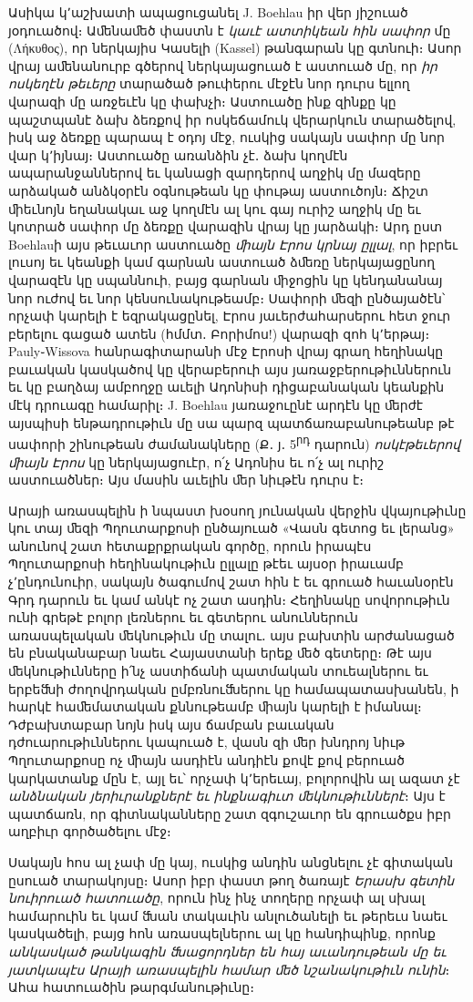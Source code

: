 \documentclass{article}
\begin{document}
{Ասիկա կ՚աշխատի ապացուցանել J. Boehlau իր վեր յիշուած յօդուածով։ Աﬔնաﬔծ փաստն է \emph{կաւէ ատտիկեան հին սափոր} մը (Λήκυθος), որ ներկայիս Կասելի (Kassel) թանգարան կը գտնուի։ Ասոր վրայ աﬔնանուրբ գծերով ներկայացուած է աստուած մը, որ \emph{իր ոսկեղէն թեւերը} տարածած թուփերու մէջէն նոր դուրս ելլող վարազի մը առջեւէն կը փախչի։ Աստուածը ինք զինքը կը պաշտպանէ ձախ ձեռքով իր ոսկեճամուկ վերարկուն տարածելով, իսկ աջ ձեռքը պարապ է օդոյ մէջ, ուսկից սակայն սափոր մը նոր վար կ՚իյնայ։ Աստուածը առանձին չէ․ ձախ կողմէն ապարանջաններով եւ կանացի զարդերով աղջիկ մը մազերը արձակած անձկօրէն օգնութեան կը փութայ աստուծոյն։ Ճիշտ ﬕեւնոյն եղանակաւ աջ կողմէն ալ կու գայ ուրիշ աղջիկ մը եւ կոտրած սափոր մը ձեռքը վարազին վրայ կը յարձակի։ Արդ ըստ Boehlauի այս թեւաւոր աստուածը \emph{ﬕայն Էրոս կրնայ ըլլալ}, որ իբրեւ լուսոյ եւ կեանքի կամ գարնան աստուած ձﬔռը ներկայացընող վարազէն կը սպաննուի, բայց գարնան ﬕջոցին կը կենդանանայ նոր ուժով եւ նոր կենսունակութեամբ։ Սափորի ﬔզի ընծայածէն՝ որչափ կարելի է եզրակացընել, Էրոս յաւերժահարսերու հետ ջուր բերելու գացած ատեն (հմմտ․ Բորիմոս!) վարազի զոհ կ՚երթայ։ Pauly֊Wissova հանրագիտարանի մէջ Էրոսի վրայ գրաղ հեղինակը բաւական կասկածով կը վերաբերուի այս յառաջբերութիւններուն եւ կը բաղձայ ամբողջը աւելի Ադոնիսի դիցաբանական կեանքին մէկ դրուագը համարիլ։ J. Boehlau յառաջուընէ արդէն կը ﬔրժէ այսպիսի ենթադրութիւն մը սա պարզ պատճառաբանութեանբ թէ սափորի շինութեան ժամանակները (Ք․ յ․ 5\textsuperscript{րդ} դարուն) \emph{ոսկէթեւերով ﬕայն Էրոս} կը ներկայացուէր, ո՛չ Ադոնիս եւ ո՛չ ալ ուրիշ աստուածներ։ Այս մասին աւելին ﬔր նիւթէն դուրս է։

Արայի առասպելին ի նպաստ խօսող յունական վերջին վկայութիւնը կու տայ ﬔզի Պղուտարքոսի ընծայուած «Վասն գետոց եւ լերանց» անունով շատ հետաքրքրական գործը, որուն իրապէս Պղուտարքոսի հեղինակութիւն ըլլալը թէեւ այսօր իրաւամբ չ՚ընդունուիր, սակայն ծագումով շատ հին է եւ գրուած հաւանօրէն Գրդ դարուն եւ կամ անկէ ոչ շատ ասդին։ Հեղինակը սովորութիւն ունի գրեթէ բոլոր լեռներու եւ գետերու անուններուն առասպելական ﬔկնութիւն մը տալու․ այս բախտին արժանացած են բնականաբար նաեւ Հայաստանի երեք ﬔծ գետերը։ Թէ այս ﬔկնութիւնները ի՛նչ աստիճանի պատմական տուեալներու եւ երբեﬓի ժողովրդական ըմբռնուﬓերու կը համապատասխանեն, ի հարկէ հաﬔմատական քննութեամբ ﬕայն կարելի է իմանալ։ Դժբախտաբար նոյն իսկ այս ճամբան բաւական դժուարութիւններու կապուած է, վասն զի ﬔր խնդրոյ նիւթ Պղուտարքոսը ոչ ﬕայն ասդիէն անդիէն քովէ քով բերուած կարկատանք մըն է, այլ եւ՝ որչափ կ՚երեւայ, բոլորովին ալ ազատ չէ \emph{անձնական յերիւրանքներէ եւ ինքնագիւտ ﬔկնութիւններէ}։ Այս է պատճառն, որ գիտնականները շատ զգուշաւոր են գրուածքս իբր աղբիւր գործածելու մէջ։

Սակայն հոս ալ չափ մը կայ, ուսկից անդին անցնելու չէ գիտական ըսուած տարակոյսը։ Ասոր իբր փաստ թող ծառայէ \emph{Երասխ գետին նուիրուած հատուածը}, որուն ինչ ինչ տողերը որչափ ալ սխալ համարուին եւ կամ ﬓան տակաւին անլուծանելի եւ թերեւս նաեւ կասկածելի, բայց հոն առասպելներու ալ կը հանդիպինք, որոնք \emph{անկասկած թանկագին ﬓացորդներ են հայ աւանդութեան մը եւ յատկապէս Արայի առասպելին համար ﬔծ նշանակութիւն ունին}։ Ահա հատուածին թարգմանութիւնը։

}
\end{document}
